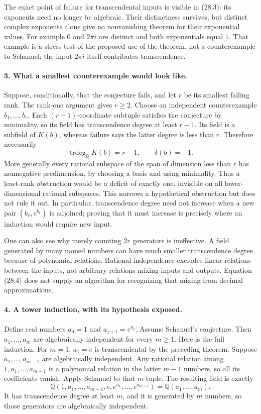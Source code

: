 \documentclass[11pt]{article}
\begin{document}
The exact point of failure for transcendental inputs is visible in (28.3):
its exponents need no longer be algebraic. Their distinctness survives, but
distinct complex exponents alone give no nonvanishing theorem for their
exponential values. For example $0$ and $2\pi i$ are distinct and both
exponentials equal $1$. That example is a stress test of the proposed use of
the theorem, not a counterexample to Schanuel: the input $2\pi i$ itself
contributes transcendence.

\paragraph{3. What a smallest counterexample would look like.}
Suppose, conditionally, that the conjecture fails, and let $r$ be its smallest
failing rank. The rank-one argument gives $r\geq2$. Choose an independent
counterexample $b_1,\ldots,b_r$. Each $(r-1)$-coordinate subtuple satisfies
the conjecture by minimality, so its field has transcendence degree at least
$r-1$. Its field is a subfield of $K(b)$, whereas failure says the latter
degree is less than $r$. Therefore necessarily
\[
 \operatorname{trdeg}_{\mathbb Q}K(b)=r-1,\qquad \delta(b)=-1.
 \tag{28.4}
\]
More generally every rational subspace of the span of dimension less than
$r$ has nonnegative predimension, by choosing a basis and using minimality.
Thus a least-rank obstruction would be a deficit of exactly one, invisible
on all lower-dimensional rational subspaces. This narrows a hypothetical
obstruction but does not rule it out. In particular, transcendence degree
need not increase when a new pair $(b_r,e^{b_r})$ is adjoined; proving that it
must increase is precisely where an induction would require new input.

One can also see why merely counting $2r$ generators is ineffective. A field
generated by many named numbers can have much smaller transcendence degree
because of polynomial relations. Rational independence excludes linear
relations between the inputs, not arbitrary relations mixing inputs and
outputs. Equation (28.4) does not supply an algorithm for recognizing that
mixing from decimal approximations.

\paragraph{4. A tower induction, with its hypothesis exposed.}
Define real numbers $a_0=1$ and $a_{j+1}=e^{a_j}$. Assume Schanuel's
conjecture. Then $a_1,\ldots,a_m$ are algebraically independent for every
$m\geq1$. Here is the full induction. For $m=1$, $a_1=e$ is transcendental
by the preceding theorem. Suppose $a_1,\ldots,a_{m-1}$ are algebraically
independent. Any rational relation among $1,a_1,\ldots,a_{m-1}$ is a
polynomial relation in the latter $m-1$ numbers, so all its coefficients
vanish. Apply Schanuel to that $m$-tuple. The resulting field is exactly
\[
 \mathbb Q(1,a_1,\ldots,a_{m-1},
                 e,e^{a_1},\ldots,e^{a_{m-1}})
 =\mathbb Q(a_1,\ldots,a_m).
\]
It has transcendence degree at least $m$, and it is generated by $m$ numbers,
so those generators are algebraically independent.
\end{document}

